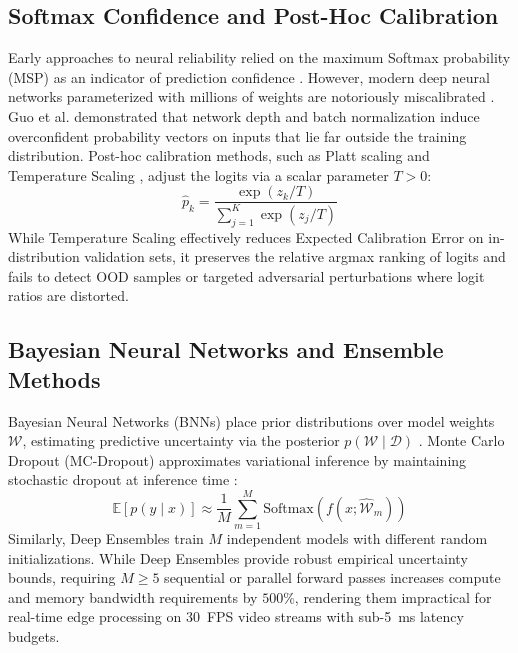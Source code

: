 \documentclass[10pt,journal,compsoc]{IEEEtran}
\begin{document}
\subsection{Softmax Confidence and Post-Hoc Calibration}
Early approaches to neural reliability relied on the maximum Softmax probability (MSP) as an indicator of prediction confidence \cite{hendrycks2017baseline}. However, modern deep neural networks parameterized with millions of weights are notoriously miscalibrated \cite{guo2017calibration}. Guo et al. demonstrated that network depth and batch normalization induce overconfident probability vectors on inputs that lie far outside the training distribution. Post-hoc calibration methods, such as Platt scaling and Temperature Scaling \cite{guo2017calibration}, adjust the logits via a scalar parameter $T > 0$:
\begin{equation}
\hat{p}_k = \frac{\exp(z_k / T)}{\sum_{j=1}^K \exp(z_j / T)}
\end{equation}
While Temperature Scaling effectively reduces Expected Calibration Error on in-distribution validation sets, it preserves the relative argmax ranking of logits and fails to detect OOD samples or targeted adversarial perturbations where logit ratios are distorted.

\subsection{Bayesian Neural Networks and Ensemble Methods}
Bayesian Neural Networks (BNNs) place prior distributions over model weights $\mathcal{W}$, estimating predictive uncertainty via the posterior $p(\mathcal{W} \mid \mathcal{D})$ \cite{blundell2015weight}. Monte Carlo Dropout (MC-Dropout) approximates variational inference by maintaining stochastic dropout at inference time \cite{gal2016dropout}:
\begin{equation}
\mathbb{E}[p(y \mid x)] \approx \frac{1}{M} \sum_{m=1}^M \text{Softmax}(f(x; \hat{\mathcal{W}}_m))
\end{equation}
Similarly, Deep Ensembles \cite{lakshminarayanan2017simple} train $M$ independent models with different random initializations. While Deep Ensembles provide robust empirical uncertainty bounds, requiring $M \ge 5$ sequential or parallel forward passes increases compute and memory bandwidth requirements by $500\%$, rendering them impractical for real-time edge processing on 30~FPS video streams with sub-5~ms latency budgets.
\end{document}
